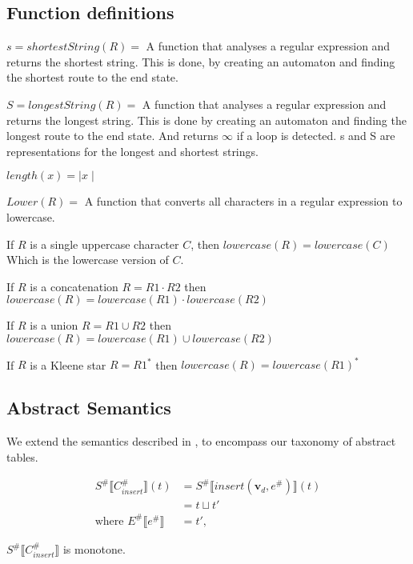 \subsection{Function definitions} \label{subsec:function-definitions}

$s = shortestString(R) =$ A function that analyses a regular expression and returns the shortest string. This is done, by creating an automaton and finding the shortest route to the end state.

$S = longestString(R) =$ A function that analyses a regular expression and returns the longest string. This is done by creating an automaton and finding the longest route to the end state. And returns $\infty$ if a loop is detected.
s and S are representations for the longest and shortest strings.

$length(x) = \mid x \mid $

$Lower(R) =$ A function that converts all characters in a regular expression to lowercase.

If $R$ is a single uppercase character $C$, then $lowercase(R)=lowercase(C)$ Which is the lowercase version of $C$.

If $R$ is a concatenation $R=R1 \cdot R2$ then $lowercase(R)=lowercase(R1) \cdot lowercase(R2)$

If $R$ is a union $R=R1 \cup R2$ then $lowercase(R)=lowercase(R1) \cup lowercase(R2)$

If $R$ is a Kleene star $R=R1^*$ then $lowercase(R)=lowercase(R1)^*$

\subsection{Abstract Semantics}

We extend the semantics described in \cite{halder_abstract_2012}, to encompass our taxonomy of abstract tables.

\begin{align*}
    S^\# \llbracket C_{insert}^\# \rrbracket (t) &= S^\# \llbracket insert(\mathbf{v}_d, e^\#) \rrbracket (t) \\
    &= t \sqcup t' \\
    \text{where } E^\# \llbracket e^\# \rrbracket &= t',
\end{align*}

\begin{lemma}
    $S^\# \llbracket C_{insert}^\# \rrbracket$ is monotone.
\end{lemma}

